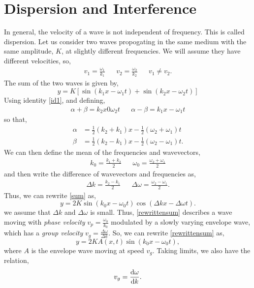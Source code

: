 \documentclass{book}
\begin{document}
\chapter{Dispersion and Interference}
In general, the velocity of a wave is not independent of frequency. This is called dispersion. Let us consider two waves propogating in the same medium with the same amplitude, $K$, at slightly different frequencies. We will assume they have different velocities, so,
\begin{align}
	v_1 = \frac{\omega_1}{k_1} && v_2 = \frac{\omega_2}{k_2} && v_1 \neq v_2.
\end{align}
The sum of the two waves is given by,
\begin{equation}
	y = K\left[\sin(k_1x -\omega_1t) + \sin(k_2x - \omega_2t)\right] \label{sum}
\end{equation}
Using identity \eqref{id1}, and defining,
\begin{align}
	\alpha + \beta = k_2x 0\omega_2t && \alpha - \beta = k_1x -\omega_1 t
\end{align}
so that,
\begin{align}
	\alpha & = \frac{1}{2}(k_2 + k_1)x - \frac{1}{2}(\omega_2 + \omega_1)t \\
	\beta & = \frac{1}{2}(k_2 - k_1)x - \frac{1}{2}(\omega_2 - \omega_1)t.
\end{align}
We can then define the mean of the frequencies and wavevectors,
\begin{align}
	k_0 = \frac{k_1 + k_2}{2} && \omega_0 = \frac{\omega_2 + \omega_1}{2}
\end{align}
and then write the difference of wavevectors and frequencies as,
\begin{align}
	\Delta k = \frac{k_2 - k_1}{2} && \Delta \omega = \frac{\omega_2 - \omega_1}{2}.
\end{align}
Thus, we can rewrite \eqref{sum} as,
\begin{equation}
	y = 2K\sin(k_0x - \omega_0 t)\cos(\Delta k x - \Delta\omega t).\label{rewrittensum}
\end{equation}
we assume that $\Delta k$ and $\Delta \omega$ is small. Thus, \eqref{rewrittensum} describes a wave moving with \textit{phase velocity} $v_p = \frac{\omega_0}{k_0}$ modulated by a slowly varying envelope wave, which has a \textit{group velocity} $v_g= \frac{\Delta \omega}{\Delta k}$. So, we can rewrite \eqref{rewrittensum} as,
\begin{equation}
	y = 2KA(x,t)\sin(k_0x - \omega_0 t),
\end{equation}
where $A$ is the envelope wave moving at speed $v_g$. Taking limits, we also have the relation,
\begin{equation}
	v_g = \dv{\omega}{k}.
\end{equation}
\end{document}
